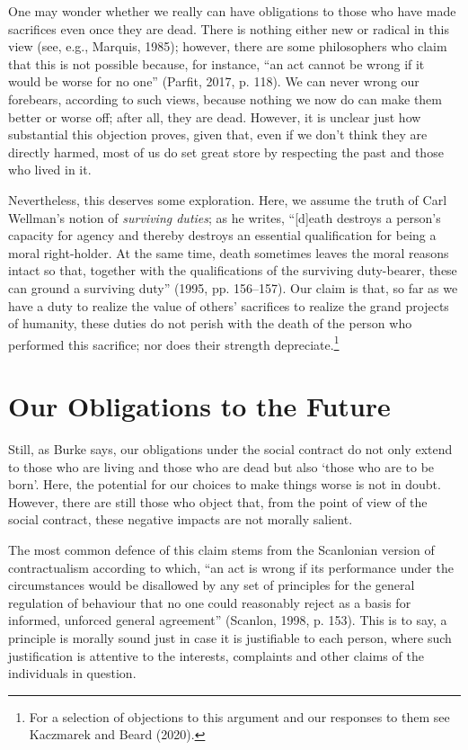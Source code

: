 \documentclass[man,11pt,a4paper]{apa7}
\begin{document}
One may wonder whether we really can have obligations to those who have made sacrifices even once they are dead. There is nothing either new or radical in this view (see, e.g., Marquis, 1985); however, there are some philosophers who claim that this is not possible because, for instance, ``an act cannot be wrong if it would be worse for no one'' (Parfit, 2017, p. 118). We can never wrong our forebears, according to such views, because nothing we now do can make them better or worse off; after all, they are dead. However, it is unclear just how substantial this objection proves, given that, even if we don't think they are directly harmed, most of us do set great store by respecting the past and those who lived in it.

Nevertheless, this deserves some exploration. Here, we assume the truth of Carl Wellman's notion of \textit{surviving duties}; as he writes, ``[d]eath destroys a person's capacity for agency and thereby destroys an essential qualification for being a moral right-holder. At the same time, death sometimes leaves the moral reasons intact so that, together with the qualifications of the surviving duty-bearer, these can ground a surviving duty'' (1995, pp. 156--157). Our claim is that, so far as we have a duty to realize the value of others' sacrifices to realize the grand projects of humanity, these duties do not perish with the death of the person who performed this sacrifice; nor does their strength depreciate.\footnote{For a selection of objections to this argument and our responses to them see Kaczmarek and Beard (2020).}

\section{Our Obligations to the Future}

Still, as Burke says, our obligations under the social contract do not only extend to those who are living and those who are dead but also `those who are to be born'. Here, the potential for our choices to make things worse is not in doubt. However, there are still those who object that, from the point of view of the social contract, these negative impacts are not morally salient.

The most common defence of this claim stems from the Scanlonian version of contractualism according to which, ``an act is wrong if its performance under the circumstances would be disallowed by any set of principles for the general regulation of behaviour that no one could reasonably reject as a basis for informed, unforced general agreement'' (Scanlon, 1998, p. 153). This is to say, a principle is morally sound just in case it is justifiable to each person, where such justification is attentive to the interests, complaints and other claims of the individuals in question.
\end{document}
